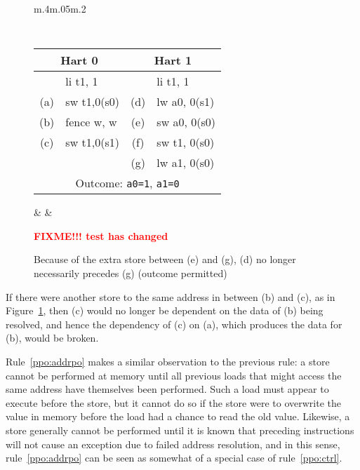 \begin{figure}[h!]
  \centering
  \begin{tabular}{m{.4\linewidth}m{.05\linewidth}m{.2\linewidth}}
  {
    \tt\small
    \begin{tabular}{cl||cl}
    \multicolumn{2}{c}{Hart 0} & \multicolumn{2}{c}{Hart 1} \\
    \hline
          & li t1, 1    &     & li t1, 1       \\
      (a) & sw t1,0(s0) & (d) & lw a0, 0(s1)   \\
      (b) & fence w, w  & (e) & sw a0, 0(s0)   \\
      (c) & sw t1,0(s1) & (f) & sw t1, 0(s0)   \\
          &             & (g) & lw a1, 0(s0)   \\
      \hline
      \multicolumn{4}{c}{Outcome: {\tt a0=1}, {\tt a1=0}}
    \end{tabular}
  } & &
  
  \textcolor{red}{\bf FIXME!!! test has changed}
  \end{tabular}

  \caption{Because of the extra store between (e) and (g), (d) no longer necessarily precedes (g) (outcome permitted)}
  \label{fig:litmus:addrdatarfi_no}
\end{figure}

If there were another store to the same address in between (b) and (c), as in Figure~\ref{fig:litmus:addrdatarfi_no}, then (c) would no longer be dependent on the data of (b) being resolved, and hence the dependency of (c) on (a), which produces the data for (b), would be broken.

Rule~\ref{ppo:addrpo} makes a similar observation to the previous rule: a store cannot be performed at memory until all previous loads that might access the same address have themselves been performed.
Such a load must appear to execute before the store, but it cannot do so if the store were to overwrite the value in memory before the load had a chance to read the old value.
Likewise, a store generally cannot be performed until it is known that preceding instructions will not cause an exception due to failed address resolution, and in this sense, rule~\ref{ppo:addrpo} can be seen as somewhat of a special case of rule~\ref{ppo:ctrl}.

